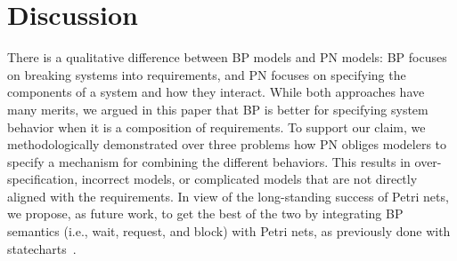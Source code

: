 \documentclass[10pt,journal,compsoc]{IEEEtran}
\theoremstyle{definition}
\begin{document}


\section{Discussion}
\label{sec:discussion}
There is a qualitative difference between BP models and PN models: BP focuses on breaking systems into requirements, and PN focuses on specifying the components of a system and how they interact. While both approaches have many merits, we argued in this paper that BP is better for specifying system behavior when it is a composition of requirements. To support our claim, we methodologically demonstrated over three problems how PN obliges modelers to specify a mechanism for combining the different behaviors. This results in over-specification, incorrect models, or complicated models that are not directly aligned with the requirements. In view of the long-standing success of Petri nets, we propose, as future work, to get the best of the two by integrating BP semantics (i.e., wait, request, and block) with Petri nets, as previously done with statecharts~\cite{marron2018embedding}. 

\end{document}
